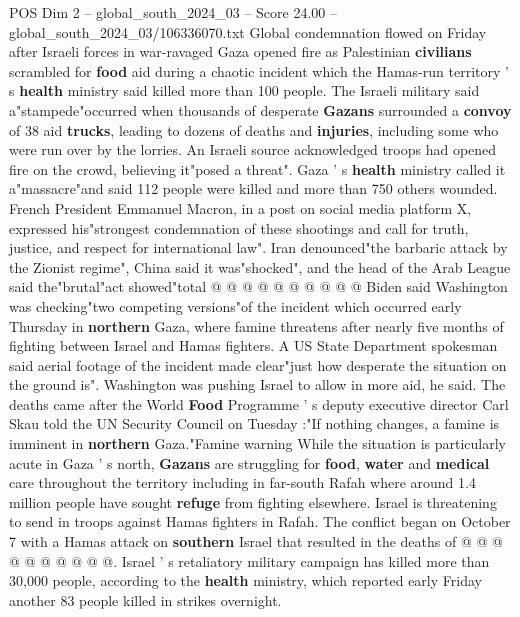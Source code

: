 \begin{textsample}{POS Dim 2 – global\_south\_2024\_03 – Score 24.00 – global\_south\_2024\_03/106336070.txt}  \label{ex:f2_pos_020}
Global condemnation flowed on Friday after Israeli forces in war-ravaged Gaza opened fire as Palestinian \textbf{civilians} scrambled for \textbf{food} aid during a chaotic incident which the Hamas-run territory ' s \textbf{health} ministry said killed more than 100 people.
The Israeli military said a"stampede"occurred when thousands of desperate \textbf{Gazans} surrounded a \textbf{convoy} of 38 aid \textbf{trucks}, leading to dozens of deaths and \textbf{injuries}, including some who were run over by the lorries.
An Israeli source acknowledged troops had opened fire on the crowd, believing it"posed a threat".
Gaza ' s \textbf{health} ministry called it a"massacre"and said 112 people were killed and more than 750 others wounded.
French President Emmanuel Macron, in a post on social media platform X, expressed his"strongest condemnation of these shootings and call for truth, justice, and respect for international law".
Iran denounced"the barbaric attack by the Zionist regime", China said it was"shocked", and the head of the Arab League said the"brutal"act showed"total @ @ @ @ @ @ @ @ @ @ Biden said Washington was checking"two competing versions"of the incident which occurred early Thursday in \textbf{northern} Gaza, where famine threatens after nearly five months of fighting between Israel and Hamas fighters.
A US State Department spokesman said aerial footage of the incident made clear"just how desperate the situation on the ground is".
Washington was pushing Israel to allow in more aid, he said.
The deaths came after the World \textbf{Food} Programme ' s deputy executive director Carl Skau told the UN Security Council on Tuesday :"If nothing changes, a famine is imminent in \textbf{northern} Gaza."Famine warning While the situation is particularly acute in Gaza ' s north, \textbf{Gazans} are struggling for \textbf{food}, \textbf{water} and \textbf{medical} care throughout the territory including in far-south Rafah where around 1.4 million people have sought \textbf{refuge} from fighting elsewhere.
Israel is threatening to send in troops against Hamas fighters in Rafah.
The conflict began on October 7 with a Hamas attack on \textbf{southern} Israel that resulted in the deaths of @ @ @ @ @ @ @ @ @ @.
Israel ' s retaliatory military campaign has killed more than 30,000 people, according to the \textbf{health} ministry, which reported early Friday another 83 people killed in strikes overnight.

\end{textsample}
